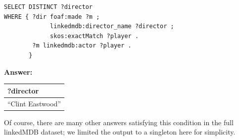 \begin{challenge}
\begin{lstlisting}
SELECT DISTINCT ?director
WHERE { ?dir foaf:made ?m ;
             linkedmdb:director_name ?director ;
             skos:exactMatch ?player . 
        ?m linkedmdb:actor ?player .
       }
\end{lstlisting}

\textbf{\textbf{Answer:}}

\begin{tabular}{|l|}
\hline
?director\\
\hline
``Clint Eastwood''\\
\hline
\end{tabular}
\end{challenge}

Of course, there are many other answers satisfying this condition in the full 
linkedMDB dataset; we limited the output to a singleton here for simplicity. 

